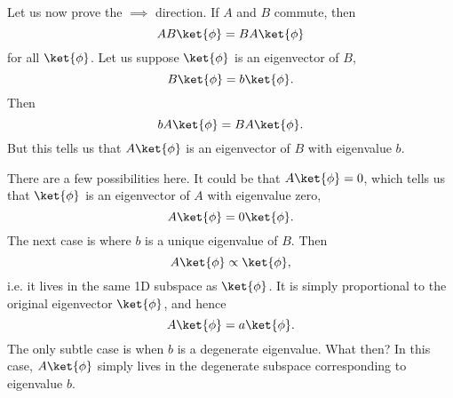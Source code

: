 Let us now prove the $\implies$ direction. If $A$ and $B$ commute, then
\begin{equation}
    AB\ket{\phi} = BA\ket{\phi}
\end{equation}
for all $\ket{\phi}$. Let us suppose $\ket{\phi}$ is an eigenvector of $B$,
\begin{equation}
    B\ket{\phi}= b\ket{\phi}.
\end{equation}
Then
\begin{equation}
    bA \ket{\phi} = B A \ket{\phi}.
\end{equation}
But this tells us that $A\ket{\phi}$ is an eigenvector of $B$ with eigenvalue $b$.

There are a few possibilities here. It could be that $A\ket{\phi}=0$, which tells us that $\ket{\phi}$ is an eigenvector of $A$ with eigenvalue zero,
\begin{equation}
    A\ket{\phi}= 0 \ket{\phi}.
\end{equation}
The next case is where $b$ is a unique eigenvalue of $B$. Then
\begin{equation}
    A\ket{\phi} \propto \ket{\phi},
\end{equation}
i.e. it lives in the same 1D subspace as $\ket{\phi}$. It is simply proportional to the original eigenvector $\ket{\phi}$, and hence
\begin{equation}
    A\ket{\phi} = a\ket{\phi}.
\end{equation}
The only subtle case is when $b$ is a degenerate eigenvalue. What then? In this case, $A\ket{\phi}$ simply lives in the degenerate subspace corresponding to eigenvalue $b$.

